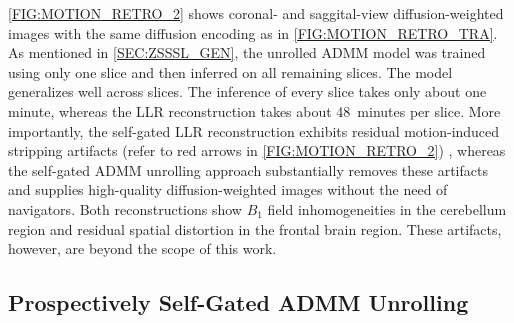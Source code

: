 \documentclass[AMA,STIX2COL,Linenumberson]{MRM}
\begin{document}
\cref{FIG:MOTION_RETRO_2} shows coronal- and saggital-view
diffusion-weighted images
with the same diffusion encoding as in \cref{FIG:MOTION_RETRO_TRA}.
As mentioned in \cref{SEC:ZSSSL_GEN}, the unrolled ADMM model
was trained using only one slice
and then inferred on all remaining slices.
The model generalizes well across slices.
The inference of every slice takes only about one minute,
whereas the LLR reconstruction takes about 48~minutes per slice.
More importantly, the self-gated LLR reconstruction exhibits residual
motion-induced stripping artifacts
(refer to red arrows in \cref{FIG:MOTION_RETRO_2}) \cite{chang_2021_musium},
whereas the self-gated ADMM unrolling approach substantially removes these artifacts
and supplies high-quality diffusion-weighted images without the need of navigators.
Both reconstructions show $B_1$ field inhomogeneities in the cerebellum region
and residual spatial distortion in the frontal brain region.
These artifacts, however, are beyond the scope of this work.


\subsection{Prospectively Self-Gated ADMM Unrolling}
\end{document}
